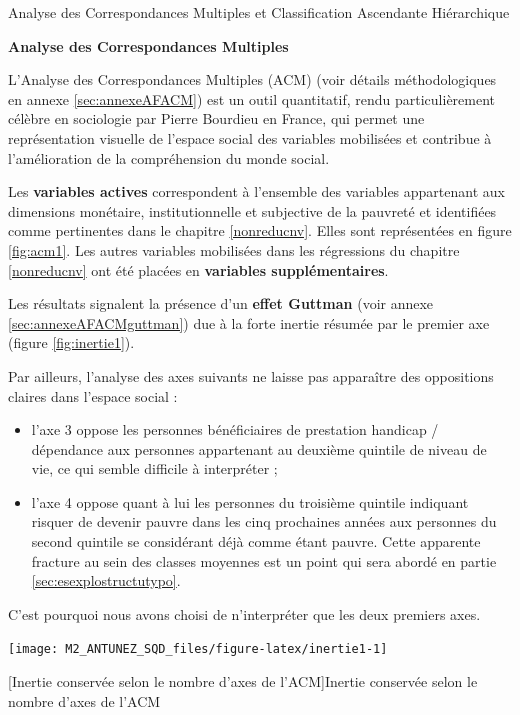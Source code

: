 \documentclass[12pt,a4paper]{reedthesis}
\newcommand{\captiontmp}[2][1]{\captionof{figure}[#1]{#2}}
\begin{document}
\begin{summary_box}[false]{Analyse des Correspondances Multiples et Classification Ascendante Hiérarchique}

\textbf{Analyse des Correspondances Multiples}

L'Analyse des Correspondances Multiples (ACM) (voir détails méthodologiques en annexe \ref{sec:annexeAFACM}) est un outil quantitatif, rendu particulièrement célèbre en sociologie par Pierre Bourdieu en France, qui permet une représentation visuelle de l'espace social des variables mobilisées et contribue à l'amélioration de la compréhension du monde social.

Les \textbf{variables actives} correspondent à l'ensemble des variables appartenant aux dimensions monétaire, institutionnelle et subjective de la pauvreté et identifiées comme pertinentes dans le chapitre \ref{nonreducnv}. Elles sont représentées en figure \ref{fig:acm1}. Les autres variables mobilisées dans les régressions du chapitre \ref{nonreducnv} ont été placées en \textbf{variables supplémentaires}.

Les résultats signalent la présence d'un \textbf{effet Guttman} (voir annexe \ref{sec:annexeAFACMguttman}) due à la forte inertie résumée par le premier axe (figure \ref{fig:inertie1}).

Par ailleurs, l'analyse des axes suivants ne laisse pas apparaître des oppositions claires dans l'espace social :
\begin{itemize}
\item
  l'axe 3 oppose les personnes bénéficiaires de prestation handicap / dépendance aux personnes appartenant au deuxième quintile de niveau de vie, ce qui semble difficile à interpréter ;
\item
  l'axe 4 oppose quant à lui les personnes du troisième quintile indiquant risquer de devenir pauvre dans les cinq prochaines années aux personnes du second quintile se considérant déjà comme étant pauvre. Cette apparente fracture au sein des classes moyennes est un point qui sera abordé en partie \ref{sec:esexplostructutypo}.
\end{itemize}
C'est pourquoi nous avons choisi de n'interpréter que les deux premiers axes.
\begin{center} \texttt{[image: M2\_ANTUNEZ\_SQD\_files/figure-latex/inertie1-1]}

\captiontmp[Inertie conservée selon le nombre d'axes de l'ACM]{Inertie conservée selon le nombre d'axes de l'ACM}\label{fig:inertie1}


\end{center}
\end{summary_box}
\end{document}
